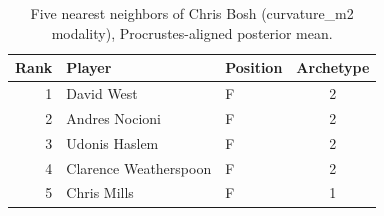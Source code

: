 \begin{table}[htbp]
  \centering\small
  \begin{tabular}{rllc}
    \toprule
    Rank & Player & Position & Archetype \\
    \midrule
    1 & David West & F & 2 \\
    2 & Andres Nocioni & F & 2 \\
    3 & Udonis Haslem & F & 2 \\
    4 & Clarence Weatherspoon & F & 2 \\
    5 & Chris Mills & F & 1 \\
    \bottomrule
  \end{tabular}
  \caption{Five nearest neighbors of Chris Bosh (curvature_m2 modality), Procrustes-aligned posterior mean.}
  \label{tab:Chris_Bosh_neighbors_curvature_m2}
\end{table}

